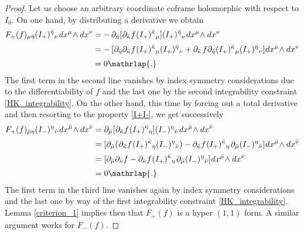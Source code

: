 \documentclass[11pt]{amsart}
\theoremstyle{remark}
\theoremstyle{remark}
\theoremstyle{definition}
\theoremstyle{definition}
\theoremstyle{definition}
\newcommand{\0}{{\scriptstyle 0'}} %
\newcommand{\1}{{\scriptstyle 1'}}
\newcommand{\pt}{\hspace{1pt}} %
\newcommand{\hp}{\hspace{0.5pt}} %
\begin{document}
\begin{proof}

Let us choose an arbitrary coordinate coframe holomorphic with respect to $I_0$. On one hand, by distributing a derivative we obtain
{\allowdisplaybreaks
\begin{align}
F_+(f)_{\mu\bar{\eta}} (I_+)^{\bar{\eta}}{}_{\nu} \pt dx^{\mu} \!\wedge dx^{\nu} & = - \, \partial_{\bar{\eta}} [\hp \partial_{\bar{\kappa}} f \hp (I_+)^{\bar{\kappa}}{}_{\mu}] (I_+)^{\bar{\eta}}{}_{\nu} \pt dx^{\mu} \!\wedge dx^{\nu} \\[2pt]
& = - \, [\hp \partial_{\bar{\eta}}\partial_{\bar{\kappa}} f \hp (I_+)^{\bar{\kappa}}{}_{\mu} (I_+)^{\bar{\eta}}{}_{\nu} +  \partial_{\bar{\kappa}} \pt f \partial_{\bar{\eta}}(I_+)^{\bar{\kappa}}{}_{\mu} (I_+)^{\bar{\eta}}{}_{\nu}] \hp dx^{\mu} \!\wedge dx^{\nu} \nonumber \\[2.5pt]
& = 0 \mathrlap{.} \nonumber
\end{align}
}%
The first term in the second line vanishes by index symmetry considerations due to the differentiability of $f$ and the last one by the second integrability constraint \eqref{HK_integrability}. On the other hand, this time by forcing out a total derivative and then resorting to the property \eqref{I+I-}, we get successively
{\allowdisplaybreaks
\begin{align}
F_+(f)_{\bar{\mu}\eta} (I_-)^{\eta}{}_{\bar{\nu}} \pt dx^{\bar{\mu}} \!\wedge dx^{\bar{\nu}} & = \partial_{\bar{\mu}} [\hp \partial_{\bar{\kappa}} f \hp (I_+)^{\bar{\kappa}}{}_{\eta}] (I_-)^{\eta}{}_{\bar{\nu}} \pt dx^{\bar{\mu}} \!\wedge dx^{\bar{\nu}} \\[2pt]
& = [\partial_{\bar{\mu}} (\hp \partial_{\bar{\kappa}} f \hp (I_+)^{\bar{\kappa}}{}_{\eta} (I_-)^{\eta}{}_{\bar{\nu}}) - \partial_{\bar{\kappa}} f \hp (I_+)^{\bar{\kappa}}{}_{\eta} \pt \partial_{\bar{\mu}} (I_-)^{\eta}{}_{\bar{\nu}}] \hp dx^{\bar{\mu}} \!\wedge dx^{\bar{\nu}} \nonumber \\[2pt]
& = [\partial_{\bar{\mu}}\partial_{\bar{\nu}} f - \partial_{\bar{\kappa}} f \hp (I_+)^{\bar{\kappa}}{}_{\eta} \pt \partial_{\bar{\mu}} (I_-)^{\eta}{}_{\bar{\nu}}] \hp dx^{\bar{\mu}} \!\wedge dx^{\bar{\nu}} \nonumber \\[2.5pt]
& = 0 \mathrlap{.} \nonumber
\end{align}
}%
The first term in the third line vanishes again by index symmetry considerations and the last one by way of the first integrability constraint \eqref{HK_integrability}. Lemma \ref{criterion_1} implies then that $F_+(f)$ is a hyper $(1,1)$ form. A similar argument works for $F_-(f)$.
\end{proof} 
\end{document}
